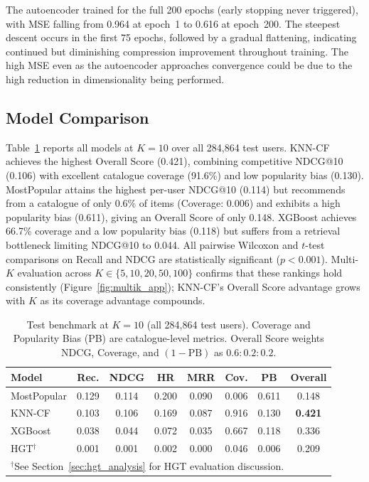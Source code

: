 The autoencoder trained for the full 200 epochs (early stopping never triggered), with MSE falling from 0.964 at epoch~1 to 0.616 at epoch~200. The steepest descent occurs in the first 75 epochs, followed by a gradual flattening, indicating continued but diminishing compression improvement throughout training. The high MSE even as the autoencoder approaches convergence could be due to the high reduction in dimensionality being performed.

\subsection{Model Comparison}

Table~\ref{tab:benchmark} reports all models at $K{=}10$ over all 284,864 test users. KNN-CF achieves the highest Overall Score (0.421), combining competitive NDCG@10 (0.106) with excellent catalogue coverage (91.6\%) and low popularity bias (0.130). MostPopular attains the highest per-user NDCG@10 (0.114) but recommends from a catalogue of only 0.6\% of items (Coverage: 0.006) and exhibits a high popularity bias (0.611), giving an Overall Score of only 0.148. XGBoost achieves 66.7\% coverage and a low popularity bias (0.118) but suffers from a retrieval bottleneck limiting NDCG@10 to 0.044. All pairwise Wilcoxon and $t$-test comparisons on Recall and NDCG are statistically significant ($p<0.001$). Multi-$K$ evaluation across $K\in\{5,10,20,50,100\}$ confirms that these rankings hold consistently (Figure~\ref{fig:multik_app}); KNN-CF's Overall Score advantage grows with $K$ as its coverage advantage compounds.

\begin{table}[h]
\centering\footnotesize
\caption{Test benchmark at $K{=}10$ (all 284,864 test users). Coverage and Popularity Bias (PB) are catalogue-level metrics. Overall Score weights NDCG, Coverage, and $(1-\mathrm{PB})$ as $0.6{:}0.2{:}0.2$.}
\label{tab:benchmark}
\setlength{\tabcolsep}{3pt}
\renewcommand{\arraystretch}{1.1}
\begin{tabular}{lccccccc}
\toprule
\textbf{Model} & \textbf{Rec.} & \textbf{NDCG} & \textbf{HR} & \textbf{MRR} & \textbf{Cov.} & \textbf{PB} & \textbf{Overall}\\
\midrule
MostPopular    & 0.129 & 0.114 & 0.200 & 0.090 & 0.006 & 0.611 & 0.148\\
KNN-CF         & 0.103 & 0.106 & 0.169 & 0.087 & 0.916 & 0.130 & \textbf{0.421}\\
XGBoost        & 0.038 & 0.044 & 0.072 & 0.035 & 0.667 & 0.118 & 0.336\\
HGT$^\dagger$  & 0.001 & 0.001 & 0.002 & 0.000 & 0.046 & 0.006 & 0.209\\
\bottomrule
\multicolumn{8}{l}{$^\dagger$See Section~\ref{sec:hgt_analysis} for HGT evaluation discussion.}
\end{tabular}
\end{table}

